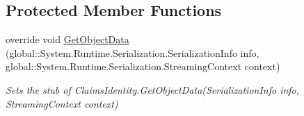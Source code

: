 \subsection*{Protected Member Functions}
\begin{DoxyCompactItemize}
\item 
override void \hyperlink{class_system_1_1_security_1_1_claims_1_1_fakes_1_1_stub_claims_identity_afc1838f14bc40cf1d17ef7253e3086a8}{Get\-Object\-Data} (global\-::\-System.\-Runtime.\-Serialization.\-Serialization\-Info info, global\-::\-System.\-Runtime.\-Serialization.\-Streaming\-Context context)
\begin{DoxyCompactList}\small\item\em Sets the stub of Claims\-Identity.\-Get\-Object\-Data(\-Serialization\-Info info, Streaming\-Context context)\end{DoxyCompactList}\end{DoxyCompactItemize}
